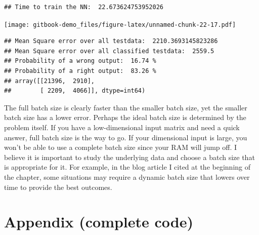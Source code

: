 \documentclass[
]{book}
\begin{document}
\begin{verbatim}
## Time to train the NN:  22.673624753952026
\end{verbatim}

\texttt{[image: gitbook-demo\_files/figure-latex/unnamed-chunk-22-17.pdf]}

\begin{verbatim}
## Mean Square error over all testdata:  2210.3693145823286
## Mean Square error over all classified testdata:  2559.5
## Probability of a wrong output:  16.74 %
## Probability of a right output:  83.26 %
## array([[21396,  2910],
##        [ 2209,  4066]], dtype=int64)
\end{verbatim}

The full batch size is clearly faster than the smaller batch size, yet the smaller batch size has a lower error. Perhaps the ideal batch size is determined by the problem itself. If you have a low-dimensional input matrix and need a quick answer, full batch size is the way to go. If your dimensional input is large, you won't be able to use a complete batch size since your RAM will jump off. I believe it is important to study the underlying data and choose a batch size that is appropriate for it. For example, in the blog article I cited at the beginning of the chapter, some situations may require a dynamic batch size that lowers over time to provide the best outcomes.

\hypertarget{appendix-complete-code-4}{%
\section{Appendix (complete code)}\label{appendix-complete-code-4}}
\end{document}
